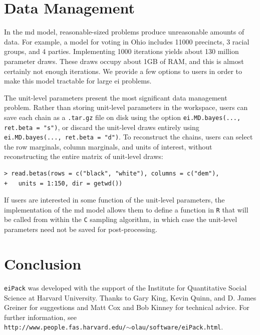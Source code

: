 \documentclass[12pt]{article}
\begin{document}


\section{Data Management}

In the {\sc md} model, reasonable-sized problems produce unreasonable
amounts of data.  For example, a model for voting in Ohio includes
11000 precincts, 3 racial groups, and 4 parties.  Implementing 1000
iterations yields about 130 million parameter draws.  These draws
occupy about 1GB of RAM, and this is almost certainly not enough
iterations.  We provide a few options to users in order to make this
model tractable for large {\sc ei} problems. 


The unit-level parameters present the most significant data management
problem.  Rather than storing unit-level parameters in the workspace, users can
save each chain as a {\tt .tar.gz} file on disk using the option
\texttt{ei.MD.bayes(..., ret.beta = "s")}, or discard the unit-level
draws entirely using \texttt{ei.MD.bayes(..., ret.beta = "d")}.  To
reconstruct the chains, users can select the row marginals, column
marginals, and units of interest, without reconstructing the entire
matrix of unit-level draws:   

\begin{verbatim}
> read.betas(rows = c("black", "white"), columns = c("dem"), 
+   units = 1:150, dir = getwd())
\end{verbatim}

If users are interested in some function of the unit-level parameters,
the implementation of the {\sc md} model allows them to define a
function in \texttt{R} that will be called from within the \texttt{C}
sampling algorithm, in which case the unit-level parameters need not
be saved for post-processing.

\section{Conclusion}

\texttt{eiPack} was developed with the support of the Institute for
Quantitative Social Science at Harvard University.  Thanks to Gary King, Kevin Quinn, and D. James Greiner for
suggestions and Matt Cox and Bob Kinney for technical advice.
For further information, see \\
\texttt{http://www.people.fas.harvard.edu/$\sim$olau/software/eiPack.html}.

 



\end{document}
